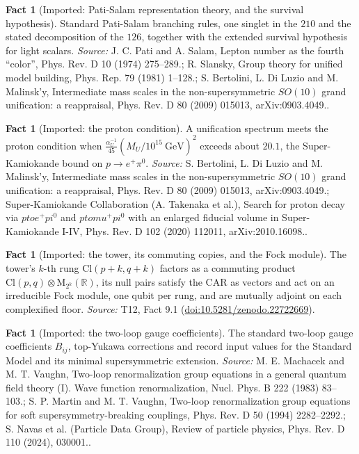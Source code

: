 \documentclass[11pt]{article}
\theoremstyle{definition}
\newtheorem{fact}[theorem]{Fact}
\theoremstyle{plain}
\providecommand{\Cl}{}\renewcommand{\Cl}{\mathrm{Cl}}
\providecommand{\Mat}{}\renewcommand{\Mat}{\mathrm{M}}
\providecommand{\R}{}\renewcommand{\R}{\mathbb{R}}
\begin{document}
\begin{fact}[Imported: Pati-Salam representation theory, and the survival hypothesis]\label{c:standard-model.imported-pati-salam-representation-theory-survival}
Standard Pati-Salam branching rules, one singlet in the $210$ and the stated decomposition of the $126$, together with the extended survival hypothesis for light scalars.
\emph{Source:} J. C. Pati and A. Salam, Lepton number as the fourth ``color'', Phys. Rev. D 10 (1974) 275--289.; R. Slansky, Group theory for unified model building, Phys. Rep. 79 (1981) 1--128.; S. Bertolini, L. Di Luzio and M. Malinsk'y, Intermediate mass scales in the non-supersymmetric $SO(10)$ grand unification: a reappraisal, Phys. Rev. D 80 (2009) 015013, arXiv:0903.4049..
\end{fact}

\begin{fact}[Imported: the proton condition]\label{c:standard-model.imported-proton-condition}
A unification spectrum meets the proton condition when $\tfrac{\alpha_{U}^{-1}}{45}(M_{U}/10^{15}\ \text{GeV})^{2}$ exceeds about $20.1$, the Super-Kamiokande bound on $p \to e^{+}\pi^{0}$.
\emph{Source:} S. Bertolini, L. Di Luzio and M. Malinsk'y, Intermediate mass scales in the non-supersymmetric $SO(10)$ grand unification: a reappraisal, Phys. Rev. D 80 (2009) 015013, arXiv:0903.4049.; Super-Kamiokande Collaboration (A. Takenaka et al.), Search for proton decay via $p to e^+pi^0$ and $p to mu^+pi^0$ with an enlarged fiducial volume in Super-Kamiokande I-IV, Phys. Rev. D 102 (2020) 112011, arXiv:2010.16098..
\end{fact}

\begin{fact}[Imported: the tower, its commuting copies, and the Fock module]\label{c:standard-model.imported-tower-commuting-copies-fock-module}
The tower's $k$-th rung $\Cl(p+k,q+k)$ factors as a commuting product $\Cl(p,q) \otimes \Mat_{2^k}(\R)$, its null pairs satisfy the CAR as vectors and act on an irreducible Fock module, one qubit per rung, and are mutually adjoint on each complexified floor.
\emph{Source:} T12, Fact 9.1 (\href{https://doi.org/10.5281/zenodo.22722669}{doi:10.5281/zenodo.22722669}).
\end{fact}

\begin{fact}[Imported: the two-loop gauge coefficients]\label{c:standard-model.imported-two-loop-gauge-coefficients}
The standard two-loop gauge coefficients $B_{ij}$, top-Yukawa corrections and record input values for the Standard Model and its minimal supersymmetric extension.
\emph{Source:} M. E. Machacek and M. T. Vaughn, Two-loop renormalization group equations in a general quantum field theory (I). Wave function renormalization, Nucl. Phys. B 222 (1983) 83--103.; S. P. Martin and M. T. Vaughn, Two-loop renormalization group equations for soft supersymmetry-breaking couplings, Phys. Rev. D 50 (1994) 2282--2292.; S. Navas et al. (Particle Data Group), Review of particle physics, Phys. Rev. D 110 (2024), 030001..
\end{fact}
\end{document}
